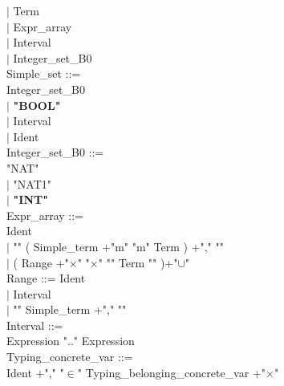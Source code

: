 \documentclass[12pt,a4paper,draft]{article}
\begin{document}
{\begin{sloppypar}
\hspace*{0.20in} $|$  Term\\ 
\hspace*{0.20in} $|$  Expr\_array \\ 
\hspace*{0.20in} $|$  Interval\\ 
\hspace*{0.20in} $|$   Integer\_set\_B0\\ 
Simple\_set ::= \\ 
\hspace*{0.20in}   Integer\_set\_B0\\ 
\hspace*{0.20in} $|$ \textbf{"BOOL"} \\ 
\hspace*{0.20in} $|$  Interval\\ 
\hspace*{0.20in} $|$ Ident \\ 
Integer\_set\_B0 ::=  \\ 
\hspace*{0.20in}  "NAT" \\ 
\hspace*{0.20in} $|$ "NAT1" \\ 
\hspace*{0.20in} $|$ \textbf{"INT"} \\ 
Expr\_array ::= \\ 
\hspace*{0.20in}  Ident \\ 
\hspace*{0.20in} $|$ "{" ( Simple\_term +"m"  "m" Term ) +","  "}" \\ 
\hspace*{0.20in} $|$ ( Range +"$\times$"  "$\times$"  "{" Term "}" )+"$\cup$"\\ 
Range ::= Ident \\ 
\hspace*{0.20in} $|$  Interval\\ 
\hspace*{0.20in} $|$ "{" Simple\_term +","  "}"\\ 
Interval ::= \\ 
\hspace*{0.20in}   Expression  ".."  Expression\\ 
Typing\_concrete\_var ::= \\ 
\hspace*{0.20in}  Ident +","   "$\in$"  Typing\_belonging\_concrete\_var +"$\times$"\\ 

\end{sloppypar}}
\end{document}
